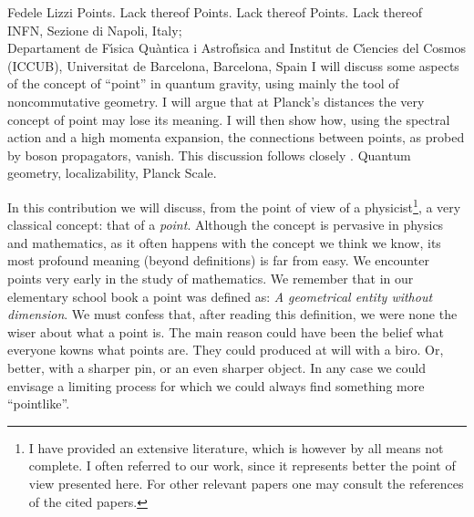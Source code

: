 \begin{artengenv}{Fedele Lizzi}
	{Points. Lack thereof}
	{Points. Lack thereof}
	{Points. Lack thereof}
	{\\
	INFN, Sezione di Napoli, Italy;\\
	Departament de F\'{\i}sica Qu\`antica i Astrof\'{\i}sica and Institut de C\'{\i}encies del Cosmos (ICCUB),
	Universitat de Barcelona, Barcelona, Spain}
	{I will discuss some aspects of the concept of ``point'' in quantum gravity, using mainly the tool of noncommutative geometry. I will argue that at Planck's distances the very concept of point may lose its meaning. I will then show how, using the spectral action and a high momenta expansion,  the connections between points, as probed by boson propagators, vanish. This discussion follows closely \parencite{Kuliva}.}
	{Quantum geometry, localizability, Planck Scale.}
	



\lettrine[loversize=0.13,lines=2,lraise=-0.05,nindent=0em,findent=0.2pt]%
{I}{}n this contribution we will discuss, from the point of view of a physicist\footnote{I have provided an extensive literature, which is however by all means not complete. I often referred to our work, since it represents better the point of view presented here. For other relevant papers one may consult the references of the cited papers.}, a very classical concept: that of a \emph{point}. Although the concept is pervasive in physics and mathematics, as it often happens with the concept we think we know, its most profound meaning (beyond definitions) is far from easy. We encounter points very early in the study of mathematics. We remember that in our elementary school book a point was defined as: \emph{A geometrical entity without dimension}. We must confess that, after reading this definition, we were none the wiser about what a point is. The main reason could have been the belief what everyone kowns what  points are. They could produced at will with a biro. Or, better, with a sharper pin, or an even sharper object. In any case we could envisage a limiting process for which we could always find something more ``pointlike''.


\end{artengenv}
